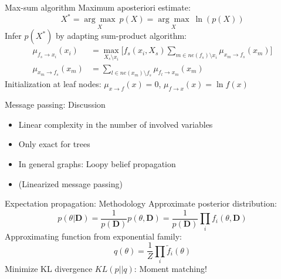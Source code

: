 \documentclass{beamer}
\begin{document}
\begin{frame}{Max-sum algorithm}
	Maximum aposteriori estimate:
	\begin{equation*}\label{eq:map_problem}
	X^* = \underset{X}{\arg\max}~ p(X) = \underset{X}{\arg\max}~ \ln (p(X))
	\end{equation*}
	Infer $p(X^*)$ by adapting sum-product algorithm:
	\begin{equation*}
	\begin{split}
	\mu_{f_s \rightarrow x_i}(x_i) &= \max_{X_s \setminus x_i} \Big[f_s(x_i, X_s) \sum_{m \in ne(f_s) \setminus x_i} \mu_{x_m \rightarrow f_s}(x_m) \Big]\\
	\mu_{x_m \rightarrow f_s}(x_m) &= \sum_{l \in ne(x_m) \setminus f_s} \mu_{f_l \rightarrow x_m}(x_m)
	\end{split}
	\end{equation*}
	Initialization at leaf nodes:
	$\mu_{x \rightarrow f}(x) = 0$, $\mu_{f \rightarrow x}(x) = \ln f(x)$
\end{frame}

\begin{frame}{Message passing: Discussion}
	\begin{itemize}
		\item Linear complexity in the number of involved variables
		\item Only exact for trees
		\item In general graphs: Loopy belief propagation
		\item (Linearized message passing)
	\end{itemize}
\end{frame}

\begin{frame}{Expectation propagation: Methodology}
	Approximate posterior distribution:
	\begin{equation*}
	p(\theta|\mathbf{D}) = \frac{1}{p(\mathbf{D})} p(\theta, \mathbf{D}) = \frac{1}{p(\mathbf{D})} \prod_i f_i(\theta , \mathbf{D})
	\end{equation*}
	Approximating function from exponential family:
	\begin{equation*}
	q(\theta) = \frac{1}{Z}\prod_i \tilde{f}_i(\theta)
	\end{equation*}
	Minimize KL divergence $KL(p||q)$: Moment matching!
\end{frame}
\end{document}
